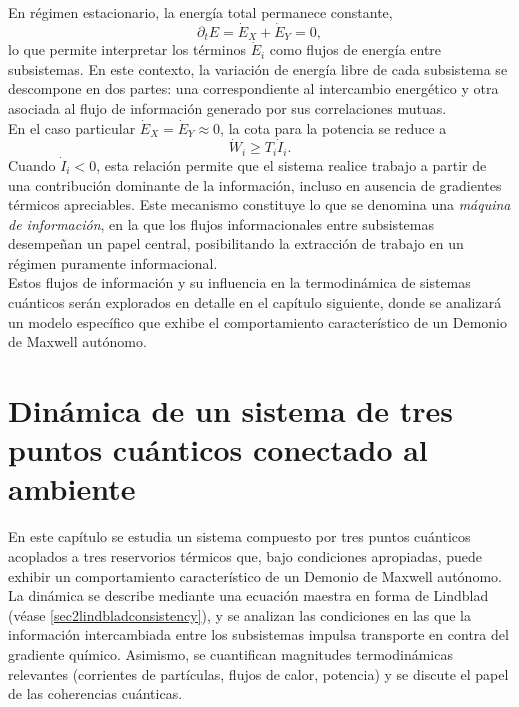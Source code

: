 En régimen estacionario, la energía total permanece constante,
\[
    \partial_{t}E = \dot{E}_{X} + \dot{E}_{Y} = 0,
\]
lo que permite interpretar los términos $\dot{E}_{i}$ como flujos de energía entre subsistemas. En este contexto, la variación de energía libre de cada subsistema se descompone en dos partes: una correspondiente al intercambio energético y otra asociada al flujo de información generado por sus correlaciones mutuas.
\\

En el caso particular $\dot{E}_{X} = \dot{E}_{Y} \approx 0$, la cota para la potencia se reduce a
\[
     \dot{W}_{i} \geq T_{i}\dot{I}_{i}.
\]
Cuando $\dot{I}_{i}<0$, esta relación permite que el sistema realice trabajo a partir de una contribución dominante de la información, incluso en ausencia de gradientes térmicos apreciables. Este mecanismo constituye lo que se denomina una \textit{máquina de información}, en la que los flujos informacionales entre subsistemas desempeñan un papel central, posibilitando la extracción de trabajo en un régimen puramente informacional. 
\\

Estos flujos de información y su influencia en la termodinámica de sistemas cuánticos serán explorados en detalle en el capítulo siguiente, donde se analizará un modelo específico que exhibe el comportamiento característico de un Demonio de Maxwell autónomo.

\label{sec4:flujos0}

\chapter{Dinámica de un sistema de tres puntos cuánticos conectado al ambiente}

En este capítulo se estudia un sistema compuesto por tres puntos cuánticos acoplados a tres reservorios térmicos que, bajo condiciones apropiadas, puede exhibir un comportamiento característico de un Demonio de Maxwell autónomo. La dinámica se describe mediante una ecuación maestra en forma de Lindblad (véase \ref{sec2lindbladconsistency}), y se analizan las condiciones en las que la información intercambiada entre los subsistemas impulsa transporte en contra del gradiente químico. Asimismo, se cuantifican magnitudes termodinámicas relevantes (corrientes de partículas, flujos de calor, potencia) y se discute el papel de las coherencias cuánticas.
\\

